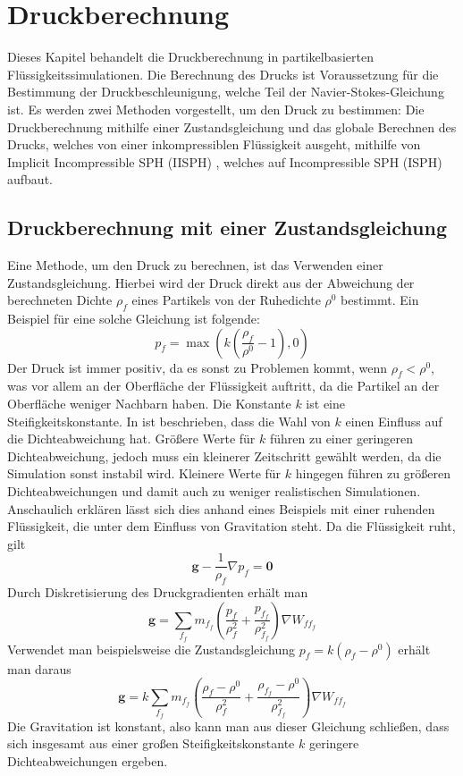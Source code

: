 \documentclass[11pt,
a4paper,
parskip=half, %
BCOR=10mm, %
english,
ngerman]{scrreprt}
\begin{document}
\chapter{Druckberechnung}
Dieses Kapitel behandelt die Druckberechnung in partikelbasierten Flüssigkeitssimulationen.
Die Berechnung des Drucks ist Voraussetzung für die Bestimmung der Druckbeschleunigung, welche Teil der Navier-Stokes-Gleichung ist.
Es werden zwei Methoden vorgestellt, um den Druck zu bestimmen:
Die Druckberechnung mithilfe einer Zustandsgleichung und das globale Berechnen des Drucks, welches von einer inkompressiblen Flüssigkeit ausgeht,
mithilfe von Implicit Incompressible SPH (IISPH) \cite{ihmsen_implicit_2014}, 
welches auf Incompressible SPH (ISPH) \cite{shao_incompressible_2003} aufbaut.


\section{Druckberechnung mit einer Zustandsgleichung}
Eine Methode, um den Druck zu berechnen, ist das Verwenden einer Zustandsgleichung.
Hierbei wird der Druck direkt aus der Abweichung der berechneten Dichte $\rho_f$ eines Partikels von der Ruhedichte $\rho^0$ bestimmt.
Ein Beispiel für eine solche Gleichung ist folgende:
\begin{equation}
    p_f = \max \left(k \left( \frac{\rho_f}{\rho^0} - 1 \right), 0\right)
\end{equation}
Der Druck ist immer positiv, da es sonst zu Problemen kommt, wenn $\rho_f < \rho^0$, was vor allem an der Oberfläche der Flüssigkeit auftritt,
da die Partikel an der Oberfläche weniger Nachbarn haben.
Die Konstante $k$ ist eine Steifigkeitskonstante.
In \cite{koschier_smoothed_2020} ist beschrieben, dass die Wahl von $k$ einen Einfluss auf die Dichteabweichung hat.
Größere Werte für $k$ führen zu einer geringeren Dichteabweichung, jedoch muss ein kleinerer Zeitschritt gewählt werden, da die Simulation sonst instabil wird.
Kleinere Werte für $k$ hingegen führen zu größeren Dichteabweichungen und damit auch zu weniger realistischen Simulationen.
Anschaulich erklären lässt sich dies anhand eines Beispiels mit einer ruhenden Flüssigkeit, die unter dem Einfluss von Gravitation steht.
Da die Flüssigkeit ruht, gilt
\begin{equation}
    \textbf{g} - \frac{1}{\rho_f}\nabla p_f = \textbf{0}
\end{equation}
Durch Diskretisierung des Druckgradienten erhält man
\begin{equation}
    \textbf{g} = \sum_{f_f} m_{f_f} \left( \frac{p_f}{\rho_f^2} + \frac{p_{f_f}}{\rho_{f_f}^2} \right) \nabla W_{ff_f}
\end{equation}
Verwendet man beispielsweise die Zustandsgleichung $p_f = k(\rho_f - \rho^0)$ erhält man daraus
\begin{equation}
    \textbf{g} = k \sum_{f_f} m_{f_f} \left( \frac{\rho_f - \rho^0}{\rho_f^2} + \frac{\rho_{f_f} - \rho^0}{\rho_{f_f}^2} \right) \nabla W_{ff_f}
\end{equation}
Die Gravitation ist konstant,
also kann man aus dieser Gleichung schließen, dass sich insgesamt aus einer großen Steifigkeitskonstante $k$ geringere Dichteabweichungen ergeben.
\end{document}
